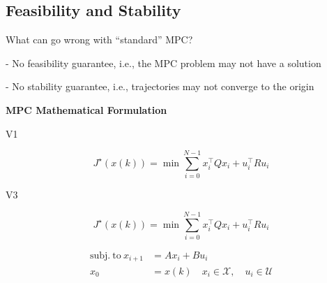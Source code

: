 
\subsection{Feasibility and Stability}

What can go wrong with “standard” MPC?

- No feasibility guarantee, i.e., the MPC problem may not have a solution

- No stability guarantee, i.e., trajectories may not converge to the origin

\begin{sstTitleBox}[ForestGreen]{\center\textbf{\large
			MPC Mathematical Formulation
		}
	}


	V1
	\begin{sstFrame}[ForestGreen]
		\small
		\color{white}
		\[
			J^\star(x(k))= \min\sum_{i=0}^{N-1}
			x_i^\top Q x_i + u_i^\top R u_i\]
	\end{sstFrame}



	V3
	\begin{adjustbox}{rndcorners=0.5mm}
		\begin{sstFrame}[ForestGreen]
			\small
			\color{white}
			\[
				J^\star(x(k))= \min\sum_{i=0}^{N-1}
				x_i^\top Q x_i + u_i^\top R u_i\]
		\end{sstFrame}
	\end{adjustbox}

	\[\begin{aligned}
			\mathrm{subj.\ to }\   x_{i+1} & = Ax_i + Bu_i \\
			x_0                            & = x(k)
			\quad x_i \in \mathcal{X},
			\quad u_i \in \mathcal{U}
		\end{aligned}\]


\end{sstTitleBox}


%


